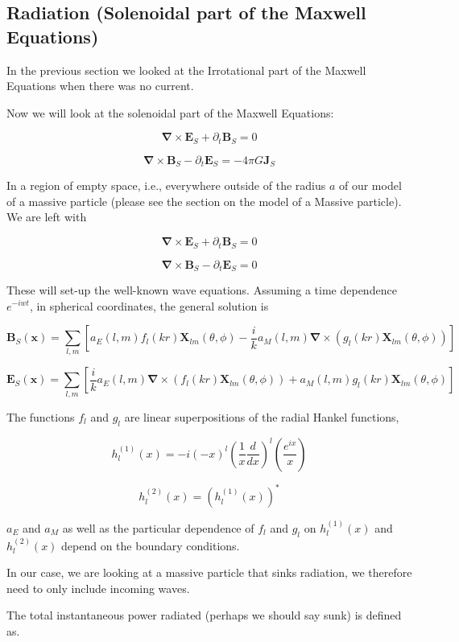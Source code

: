 \documentclass {article}
\renewcommand\vec{\mathbf}
\let\OldS\nabla
\renewcommand{\nabla}{\boldsymbol{\OldS}}
\begin{document}
\subsection{Radiation (Solenoidal part of the Maxwell Equations)}

In the previous section we looked at the Irrotational part of the Maxwell Equations when there was no current.

Now we will look at the solenoidal part of the Maxwell Equations:

$$\nabla \times \vec E_S + \partial_t \vec B_S = 0 $$

$$\nabla \times \vec B_S - \partial_t \vec E_S =  - 4 \pi G \vec J_S$$

In a region of empty space, i.e., everywhere outside of the radius $a$ of our model of a massive particle (please see the section on the model of a Massive particle). We are left with 

$$\nabla \times \vec E_S + \partial_t \vec B_S = 0 $$

$$\nabla \times \vec B_S - \partial_t \vec E_S =  0$$

These will set-up the well-known wave equations. Assuming a time dependence $e^{-iwt}$, in spherical coordinates, the general solution is

$$\vec B_S (\vec x) = \sum_{l, m} \left[ a_E(l,m)f_l(kr) \vec X_{lm}(\theta , \phi) - \frac i k a_M (l, m) \nabla \times \left(  g_l (kr) \vec X_{lm} (\theta , \phi) \right) \right]$$

$$ \vec E_S (\vec x) = \sum_{l, m} \left[ \frac i k a_E(l,m) \nabla \times  \left( f_l (kr) \vec X_{lm}(\theta, \phi)\right) + a_M(l,m) g_l (kr) \vec X_{lm}(\theta, \phi) \right]$$

The functions $f_l$ and $g_l$ are linear superpositions of the radial Hankel functions,

$$h_l^{(1)}(x) = -i (-x)^l \left(\frac 1 x \frac d {dx} \right)^l \left(\frac {e^{ix}} x \right)$$

$$h_l^{(2)}(x) = \left( h_l^{(1)}(x) \right)^*$$

\noindent $a_E$ and $a_M$ as well as the particular dependence of $f_l$ and $g_l$ on $h_l^{(1)}(x) $ and $h_l^{(2)}(x) $ depend on the boundary conditions.

In our case, we are looking at a massive particle that sinks radiation, we therefore need to only include incoming waves.

The total instantaneous power radiated (perhaps we should say sunk) is defined as.
\end{document}
